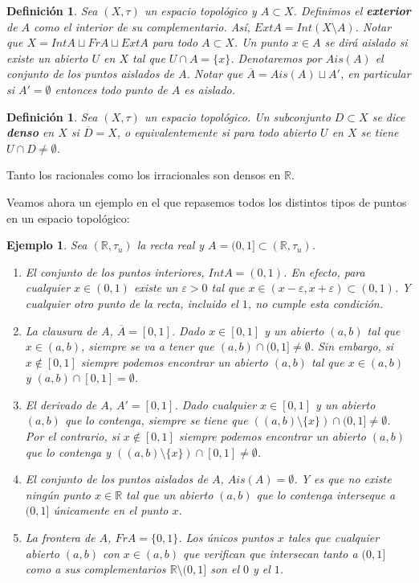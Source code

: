 \documentclass[12pt]{article}
\newtheorem{definition}[theorem]{Definición}
\newtheorem{example}{Ejemplo}[theorem]
\begin{document}
\begin{definition}Sea $(X, \tau)$ un espacio topológico y $A \subset X$. Definimos el \textbf{exterior} de $A$ como el interior de su complementario. Así, $Ext A = Int (X \setminus A)$.  Notar que $X = Int A \sqcup Fr A \sqcup Ext A$ para todo $A \subset X$. Un punto $x \in A$ se dirá aislado si existe un abierto $U$ en $X$ tal que $U \cap A = \lbrace x \rbrace$. Denotaremos por $Ais(A)$ el conjunto de los puntos aislados de $A$. Notar que $\overline{A} = Ais(A) \sqcup A'$, en particular si $A' = \emptyset$ entonces todo punto de $A$ es aislado.
\end{definition}

\begin{definition}Sea $(X, \tau)$ un espacio topológico. Un subconjunto $D \subset X$ se dice \textbf{denso} en $X$ si $\overline{D} = X$, o equivalentemente si para todo abierto $U$ en $X$ se tiene $U \cap D \neq \emptyset$.
\end{definition}

Tanto los racionales como los irracionales son densos en $\mathbb{R}$.

Veamos ahora un ejemplo en el que repasemos todos los distintos tipos de puntos en un espacio topológico:

\begin{example}Sea $(\mathbb{R}, \tau_u)$ la recta real y $A = (0,1] \subset (\mathbb{R}, \tau_u)$.
\begin{enumerate}
\item El conjunto de los puntos interiores, $Int A = (0,1)$. En efecto, para cualquier $x \in (0,1)$ existe un $\varepsilon >0$ tal que $x \in (x-\varepsilon, x+ \varepsilon) \subset (0,1)$. Y cualquier otro punto de la recta, incluido el $1$, no cumple esta condición.
\item La clausura de $A$, $\overline{A} = [0,1]$. Dado $x \in [0,1]$ y un abierto $(a,b)$ tal que $x \in (a,b)$, siempre se va a tener que $(a,b) \cap (0,1] \neq \emptyset$. Sin embargo, si $x \notin [0,1]$ siempre podemos encontrar un abierto $(a,b)$ tal que $x \in (a,b)$ y $(a,b) \cap [0,1] = \emptyset$.
\item El derivado de $A$, $A' = [0,1]$. Dado cualquier $x \in [0,1]$ y un abierto $(a,b)$ que lo contenga, siempre se tiene que $((a,b) \setminus \lbrace x \rbrace ) \cap (0,1] \neq \emptyset$. Por el contrario, si $x \notin [0,1]$ siempre podemos encontrar un abierto $(a,b)$ que lo contenga y $((a,b) \setminus \lbrace x \rbrace ) \cap [0,1] \neq \emptyset$.
\item El conjunto de los puntos aislados de $A$, $Ais(A) = \emptyset$. Y es que no existe ningún punto $x \in \mathbb{R}$ tal que un abierto $(a,b)$ que lo contenga interseque a $(0, 1]$ únicamente en el punto $x$.
\item La frontera de $A$, $Fr A = \lbrace 0, 1\rbrace$. Los únicos puntos $x$ tales que cualquier abierto $(a,b)$ con $x \in (a,b)$ que verifican que intersecan tanto a $(0,1]$ como a sus complementarios $\mathbb{R}\setminus (0,1]$ son el $0$ y el $1$.
\end{enumerate}
\end{example}
\end{document}
